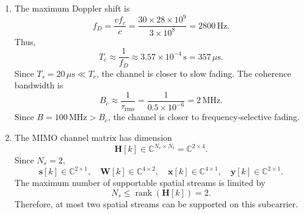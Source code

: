 \begin{enumerate}[label=\textbf{\arabic*.}, leftmargin=*]
    \item The maximum Doppler shift is
    \[
        f_D=\frac{v f_c}{c}
        =
        \frac{30\times28\times10^9}{3\times10^8}
        =
        2800\,\mathrm{Hz}.
    \]
    Thus,
    \[
        T_c\approx\frac{1}{f_D}\approx3.57\times10^{-4}\,\mathrm{s}
        =
        357\,\mu\mathrm{s}.
    \]
    Since \(T_s=20\,\mu\mathrm{s}\ll T_c\), the channel is closer to slow
    fading. The coherence bandwidth is
    \[
        B_c\approx\frac{1}{\tau_{\mathrm{rms}}}
        =
        \frac{1}{0.5\times10^{-6}}
        =
        2\,\mathrm{MHz}.
    \]
    Since \(B=100\,\mathrm{MHz}>B_c\), the channel is closer to
    frequency-selective fading.

    \item The MIMO channel matrix has dimension
    \[
        \mathbf{H}[k]\in\mathbb{C}^{N_r\times N_t}
        =
        \mathbb{C}^{2\times4}.
    \]
    Since \(N_s=2\),
    \[
        \mathbf{s}[k]\in\mathbb{C}^{2\times1},
        \quad
        \mathbf{W}[k]\in\mathbb{C}^{4\times2},
        \quad
        \mathbf{x}[k]\in\mathbb{C}^{4\times1},
        \quad
        \mathbf{y}[k]\in\mathbb{C}^{2\times1}.
    \]
    The maximum number of supportable spatial streams is limited by
    \[
        N_s\leq\operatorname{rank}(\mathbf{H}[k])=2.
    \]
    Therefore, at most two spatial streams can be supported on this subcarrier.

\end{enumerate}
